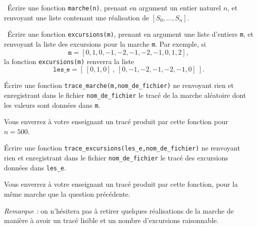 \medskip

\question\ Écrire une fonction \texttt{marche(n)}, prenant en argument un entier naturel $n$, et renvoyant une liste contenant une réalisation de $[S_0,\dots,S_n]$. 

\medskip

\question\ Écrire une fonction \texttt{excursions(m)}, prenant en argument une liste d'entiers \texttt{m}, et renvoyant la liste des excursions pour la marche \texttt{m}. Par exemple, si 
  \begin{equation*}
    \texttt{m} = [0,1,0,-1,-2,-1,-2,-1,0,1,2],
  \end{equation*}
la fonction \texttt{excursions(m)} renverra la liste 
  \begin{equation*}
    \texttt{les\_e}  = [~[0,1,0]~,~[0,-1,-2,-1,-2,-1,0]~].
  \end{equation*}
  
\medskip

\question\label{PLT-000:qu:marche} Écrire une fonction \texttt{trace\_marche(m,nom\_de\_fichier)} ne renvoyant rien et enregistrant dans le fichier \texttt{nom\_de\_fichier} le tracé de la marche aléatoire dont les valeurs sont données dans \texttt{m}.

  Vous enverrez à votre enseignant un tracé produit par cette fonction pour $n=500$. 

  \medskip

\question\label{PLT-000:qu:excursions} Écrire une fonction \texttt{trace\_excursions(les\_e,nom\_de\_fichier)} ne renvoyant rien et enregistrant dans le fichier \texttt{nom\_de\_fichier} le tracé des excursions données dans \texttt{les\_e}.

  Vous enverrez à votre enseignant un tracé produit par cette fonction, pour la même marche que la question précédente.
  
  \emph{Remarque :} on n'hésitera pas à retirer quelques réalisations de la marche de manière à avoir un tracé lisible et un nombre d'excursions raisonnable.  
